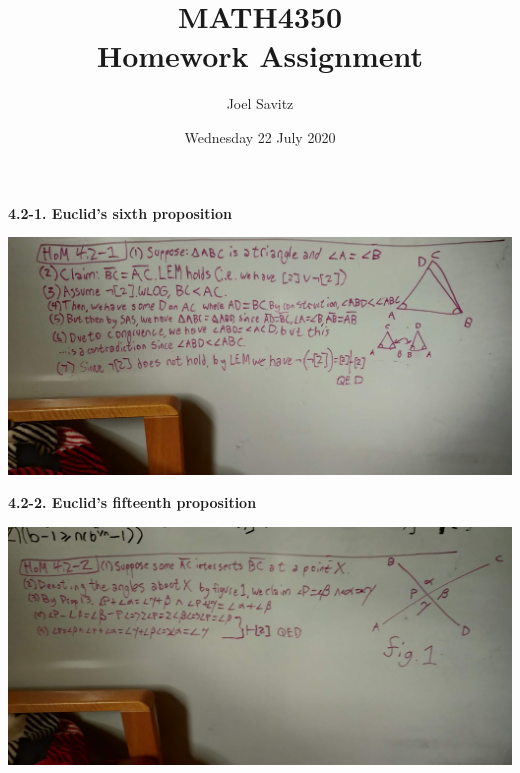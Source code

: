 \documentclass[12pt]{article}
\title{MATH4350 \\ Homework Assignment}
\author{Joel Savitz}
\date{Wednesday 22 July 2020}
\begin{document}
\maketitle

\textbf{4.2-1. Euclid's sixth proposition}
\medskip

\includegraphics[scale=0.08]{1.jpg}

\pagebreak
\textbf{4.2-2. Euclid's fifteenth proposition}
\medskip

\includegraphics[scale=0.08]{2.jpg}
\end{document}
